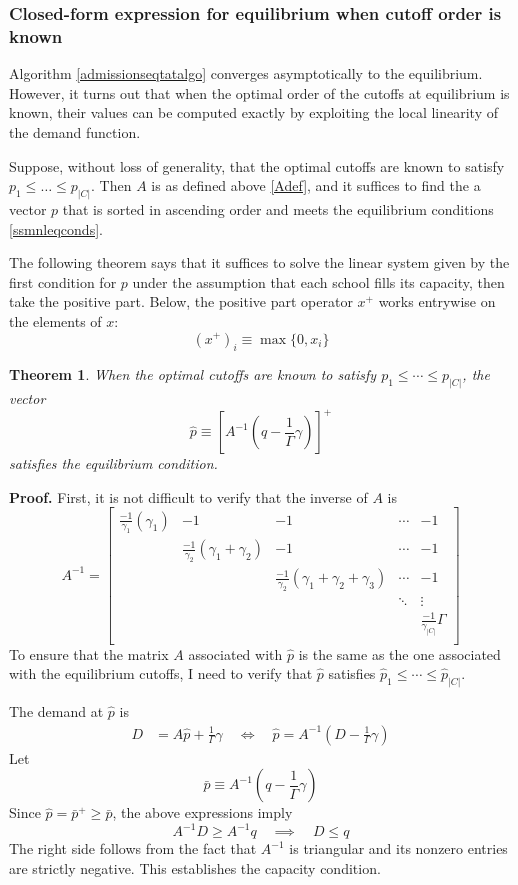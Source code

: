 \documentclass[12pt]{article}
\newtheorem{theorem}{Theorem}
\theoremstyle{definition}
\begin{document}
\subsubsection{Closed-form expression for equilibrium when cutoff order is known}
Algorithm \ref{admissionseqtatalgo} converges asymptotically to the equilibrium. However, it turns out that when the optimal order of the cutoffs at equilibrium is known, their values can be computed exactly by exploiting the local linearity of the demand function.

Suppose, without loss of generality, that the optimal cutoffs are known to satisfy $p_1 \leq \dots \leq p_{|C|}$. Then $A$ is as defined above \eqref{Adef}, and it suffices to find the a vector $p$ that is sorted in ascending order and meets the equilibrium conditions \eqref{ssmnleqconds}. 

The following theorem says that it suffices to solve the linear system given by the first condition for $p$ under the assumption that each school fills its capacity, then take the positive part. Below, the positive part operator $x^+$ works entrywise on the elements of $x$:
\[(x^+)_i \equiv \max\{0, x_i\}\]
\begin{theorem}When the optimal cutoffs are known to satisfy $p_1 \leq \cdots \leq p_{|C|}$, the vector
\[\hat p \equiv \left[A^{-1} (q - \frac{1}{\Gamma} \gamma) \right]^+\]
satisfies the equilibrium condition.\end{theorem}

\textbf{Proof.} First, it is not difficult to verify that the inverse of $A$ is
\[A^{-1} = \begin{bmatrix}
\frac{-1}{\gamma_1}\left( \gamma_1 \right) & -1 & -1 &\cdots & -1 \\
 & \frac{-1}{\gamma_2}\left( \gamma_1 + \gamma_2 \right) & -1 &\cdots & -1 \\
 & & \frac{-1}{\gamma_2}\left( \gamma_1 + \gamma_2 + \gamma_3 \right) &\cdots & -1 \\
 &  &  & \ddots & \vdots \\
 & & & &  \frac{-1}{\gamma_{|C|}} \Gamma \\
\end{bmatrix}\]
To ensure that the matrix $A$ associated with $\hat p$ is the same as the one associated with the equilibrium cutoffs, I need to verify that $\hat p$ satisfies $\hat p_1 \leq \cdots \leq \hat p_{|C|}$.


The demand at $\hat p$ is 
\begin{align*}
D &= A \hat p + \frac{1}{\Gamma}\gamma\quad
\iff \quad \hat p = A^{-1} (D - \frac{1}{\Gamma} \gamma)
\end{align*}
Let
\[\bar p \equiv A^{-1} (q - \frac{1}{\Gamma} \gamma)\]
Since $\hat p = \bar p^+ \geq \bar p$, the above expressions imply
\[A^{-1} D \geq A^{-1} q \quad \implies \quad D \leq q\]
The right side follows from the fact that $A^{-1}$ is triangular and its nonzero entries are strictly negative. This establishes the capacity condition. 
\end{document}
